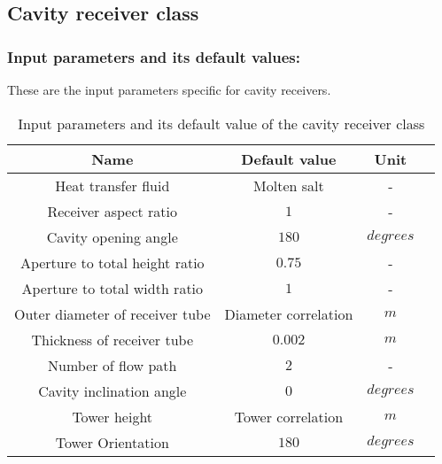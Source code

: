 \subsection{Cavity receiver class}
\subsubsection{Input parameters and its default values:}
These are the input parameters specific for cavity receivers.
\begin{table}[h!]
	\begin{center}
		\begin{tabular}{ |c|c|c|c| } 
			\hline
			\textbf{Name} & \textbf{Default value} & \textbf{Unit} \\
			\hline
			Heat transfer fluid & Molten salt & - \\
			\hline
			Receiver aspect ratio & $1$ & - \\
			\hline
			Cavity opening angle & $180$ & $degrees$ \\
			\hline
			Aperture to total height ratio & $0.75$ & - \\
			\hline
			Aperture to total width ratio & $1$ & - \\
			\hline
			Outer diameter of receiver tube & Diameter correlation & $m$ \\
			\hline
			Thickness of receiver tube & $0.002$ & $m$ \\
			\hline
			Number of flow path & $2$ & - \\
			\hline
			Cavity inclination angle & $0$ &  $degrees$ \\
			\hline
			Tower height & Tower correlation & $m$ \\
			\hline
			Tower Orientation & $180$ & $degrees$ \\
			\hline
		\end{tabular}
		\caption{Input parameters and its default value of the cavity receiver class}
		\label{Cavity receiver class input parameters}
	\end{center}
\end{table}

